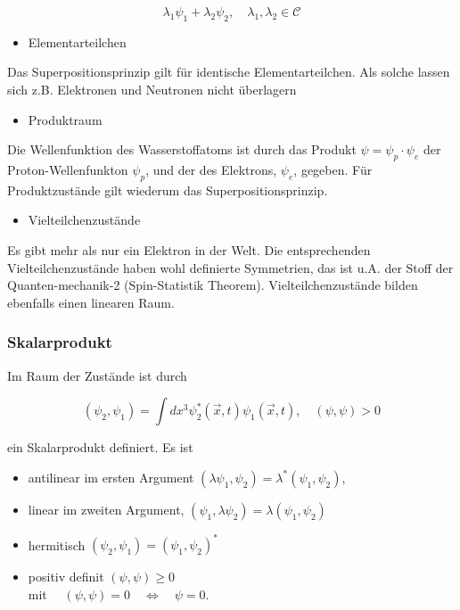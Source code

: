 \documentclass[10pt, letterpaper]{article}
\begin{document}
$$
\lambda_{1} \psi_{1}+\lambda_{2} \psi_{2}, \quad \lambda_{1}, \lambda_{2} \in \mathcal{C}
$$

\begin{itemize}
  \item Elementarteilchen
\end{itemize}

Das Superpositionsprinzip gilt für identische Elementarteilchen. Als solche lassen sich z.B. Elektronen und Neutronen nicht überlagern

\begin{itemize}
  \item Produktraum
\end{itemize}

Die Wellenfunktion des Wasserstoffatoms ist durch das Produkt $\psi=\psi_{p} \cdot \psi_{e}$ der Proton-Wellenfunkton $\psi_{p}$, und der des Elektrons, $\psi_{e}$, gegeben. Für Produktzustände gilt wiederum das Superpositionsprinzip.

\begin{itemize}
  \item Vielteilchenzustände
\end{itemize}

Es gibt mehr als nur ein Elektron in der Welt. Die entsprechenden Vielteilchenzustände haben wohl definierte Symmetrien, das ist u.A. der Stoff der Quanten-mechanik-2 (Spin-Statistik Theorem). Vielteilchenzustände bilden ebenfalls einen linearen Raum.

\subsubsection*{Skalarprodukt}
Im Raum der Zustände ist durch

$$
\left(\psi_{2}, \psi_{1}\right)=\int d x^{3} \psi_{2}^{*}(\vec{x}, t) \psi_{1}(\vec{x}, t), \quad(\psi, \psi)>0
$$

ein Skalarprodukt definiert. Es ist

\begin{itemize}
  \item antilinear im ersten Argument $\left(\lambda \psi_{1}, \psi_{2}\right)=\lambda^{*}\left(\psi_{1}, \psi_{2}\right)$,
  \item linear im zweiten Argument, $\left(\psi_{1}, \lambda \psi_{2}\right)=\lambda\left(\psi_{1}, \psi_{2}\right)$
  \item hermitisch $\left(\psi_{2}, \psi_{1}\right)=\left(\psi_{1}, \psi_{2}\right)^{*}$
  \item positiv definit $(\psi, \psi) \geq 0$\\
mit $\quad(\psi, \psi)=0 \quad \Leftrightarrow \quad \psi=0$.
\end{itemize}
\end{document}
